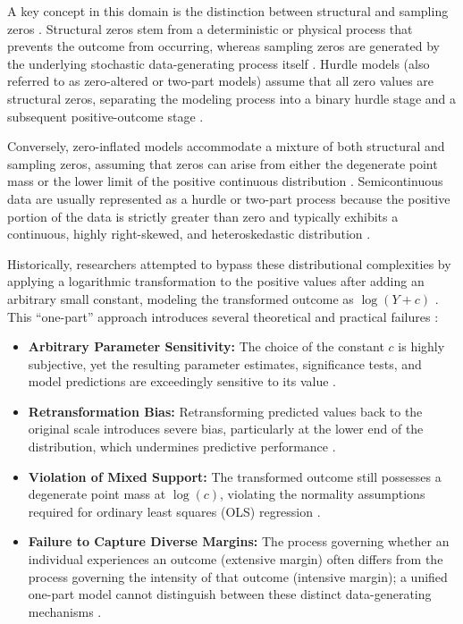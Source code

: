 A key concept in this domain is the distinction between structural and sampling zeros \cite{lambert1992}. Structural zeros stem from a deterministic or physical process that prevents the outcome from occurring, whereas sampling zeros are generated by the underlying stochastic data-generating process itself \cite{lambert1992}. Hurdle models (also referred to as zero-altered or two-part models) assume that all zero values are structural zeros, separating the modeling process into a binary hurdle stage and a subsequent positive-outcome stage \cite{lambert1992, cragg1971}. 

Conversely, zero-inflated models accommodate a mixture of both structural and sampling zeros, assuming that zeros can arise from either the degenerate point mass or the lower limit of the positive continuous distribution \cite{min2005, lambert1992}. Semicontinuous data are usually represented as a hurdle or two-part process because the positive portion of the data is strictly greater than zero and typically exhibits a continuous, highly right-skewed, and heteroskedastic distribution \cite{olsen2001, tobit1958}.

Historically, researchers attempted to bypass these distributional complexities by applying a logarithmic transformation to the positive values after adding an arbitrary small constant, modeling the transformed outcome as $\log(Y + c)$ \cite{tobit1958, duan1983}. This ``one-part'' approach introduces several theoretical and practical failures \cite{tobit1958, duan1983}:
\begin{itemize}
    \item \textbf{Arbitrary Parameter Sensitivity:} The choice of the constant $c$ is highly subjective, yet the resulting parameter estimates, significance tests, and model predictions are exceedingly sensitive to its value \cite{duan1983}.
    \item \textbf{Retransformation Bias:} Retransforming predicted values back to the original scale introduces severe bias, particularly at the lower end of the distribution, which undermines predictive performance \cite{duan1983}.
    \item \textbf{Violation of Mixed Support:} The transformed outcome still possesses a degenerate point mass at $\log(c)$, violating the normality assumptions required for ordinary least squares (OLS) regression \cite{tobit1958, duan1983}.
    \item \textbf{Failure to Capture Diverse Margins:} The process governing whether an individual experiences an outcome (extensive margin) often differs from the process governing the intensity of that outcome (intensive margin); a unified one-part model cannot distinguish between these distinct data-generating mechanisms \cite{duan1983}.
\end{itemize}

